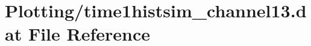 \hypertarget{Plotting_2time1histsim__channel13_8dat}{}\section{Plotting/time1histsim\+\_\+channel13.dat File Reference}
\label{Plotting_2time1histsim__channel13_8dat}
